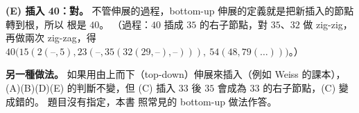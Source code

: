 \begin{pastsoln}
\textbf{(E) 插入 40：對。} 不管伸展的過程，bottom-up 伸展的定義就是把新插入的節點轉到根，所以
根是 $40$。 （過程：$40$ 插成 $35$ 的右子節點，對 $35$、$32$ 做 zig-zig，再做兩次 zig-zag，得
$40\bigl(15(2(\text{--}, 5), 23(\text{--}, 35(32(29, \text{--}), \text{--}))),\ 54(48, 79(\ldots))\bigr)$。）

\textbf{另一種做法。} 如果用由上而下（top-down）伸展來插入（例如 Weiss 的課本），(A)(B)(D)(E)
的判斷不變，但 (C) 插入 $33$ 後 $35$ 會成為 $33$ 的右子節點，(C) 變成錯的。 題目沒有指定，本書
照常見的 bottom-up 做法作答。
\end{pastsoln}
